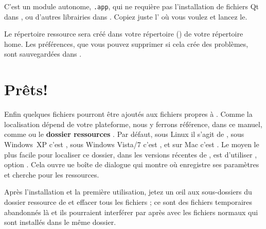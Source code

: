 C'est un module autonome, \texttt{.app}, qui ne requière pas l'installation de fichiers Qt dans , ou d'autres librairies dans . Copiez juste l' où vous voulez et lancez le.

Le répertoire ressource \Tw{} sera créé dans votre répertoire  () de votre répertoire home. Les préférences, que vous pouvez supprimer si cela crée des problèmes, sont sauvegardées dans  .

\section{Prêts!}

Enfin quelques fichiers pourront être ajoutés aux fichiers \og propres\fg{} à \Tw. Comme la localisation dépend de votre plateforme, nous y ferrons référence, dans ce manuel, comme  ou le \textbf{dossier ressources \Tw}.
Par défaut, sous Linux il s'agit de , sous Windows~XP c'est , sous Windows Vista/7 c'est , et sur Mac c'est .
Le moyen le plus facile pour localiser ce dossier, dans les versions récentes de \Tw, est d'utiliser , option \submenu{}. Cela ouvre ue boîte de dialogue qui montre où \Tw{} enregistre ses paramètres et cherche pour les ressources.

Après l'installation et la première utilisation, jetez un œil aux sous-dossiers du dossier ressource de \Tw{} et effacer tous les fichiers ; ce sont des fichiers temporaires abandonnés là et ils pourraient interférer par après avec les fichiers normaux qui sont installés dans le même dossier.

